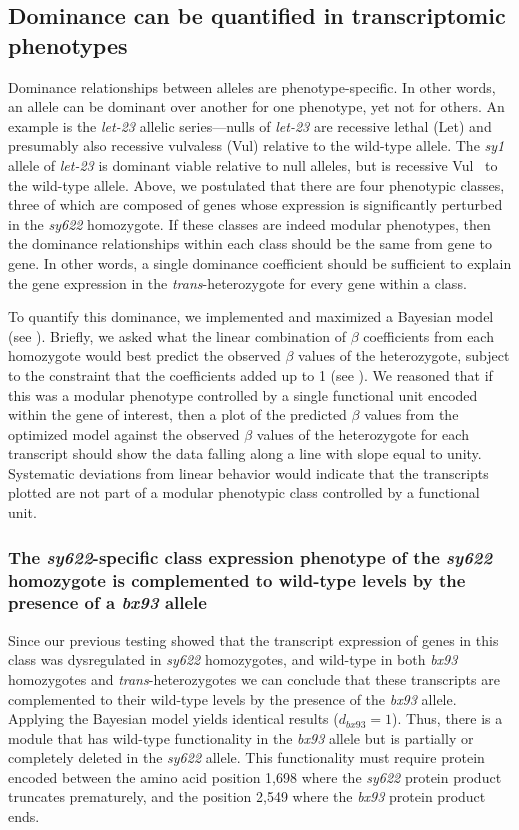 \documentclass[10pt, twocolumn]{article}
\newcommand{\gene}[1]{\mbox{\emph{#1}}}
\begin{document}
\subsection*{Dominance can be quantified in transcriptomic phenotypes}
Dominance relationships between alleles are phenotype-specific. In other words,
an allele can be dominant over another for one phenotype, yet not for others. An
example is the \gene{let-23} allelic series---nulls of \gene{let-23} are
recessive lethal (Let) and presumably also recessive vulvaless (Vul) relative to
the wild-type allele. The \emph{sy1} allele of \gene{let-23} is dominant viable
relative to null alleles, but is recessive Vul~\cite{Aroian1991} to the
wild-type allele. Above, we postulated that there are four phenotypic classes,
three of which are composed of genes whose expression is significantly perturbed
in the \emph{sy622} homozygote. If these classes are indeed modular phenotypes,
then the dominance relationships within each class should be the same from gene
to gene. In other words, a single dominance coefficient should be sufficient to
explain the gene expression in the \emph{trans}-heterozygote for every gene
within a class.

To quantify this dominance, we implemented and maximized a Bayesian model (see
). Briefly, we asked what the linear combination of $\beta$
coefficients from each homozygote would best predict the observed $\beta$ values
of the heterozygote, subject to the constraint that the coefficients added up to
1 (see ). We reasoned that if this was a modular
phenotype controlled by a single functional unit encoded within the gene of
interest, then a plot of the predicted $\beta$ values from the optimized model
against the observed $\beta$ values of the heterozygote for each transcript
should show the data falling along a line with slope equal to unity. Systematic
deviations from linear behavior would indicate that the transcripts plotted are
not part of a modular phenotypic class controlled by a functional unit.

\subsubsection*{The \emph{sy622}-specific class expression phenotype of the
                \emph{sy622} homozygote is complemented to wild-type levels by
                the presence of a \emph{bx93} allele}
Since our previous testing showed that the transcript expression of genes in
this class was dysregulated in \emph{sy622} homozygotes, and wild-type in both
\emph{bx93} homozygotes and \emph{trans}-heterozygotes we can conclude that
these transcripts are complemented to their wild-type levels by the presence of
the \emph{bx93} allele. Applying the Bayesian model yields identical results
($d_{bx93} = 1$). Thus, there is a module that has wild-type functionality in
the \emph{bx93} allele but is partially or completely deleted in the
\emph{sy622} allele. This functionality must require protein encoded between the
amino acid position 1,698 where the \emph{sy622} protein product truncates
prematurely, and the position 2,549 where the \emph{bx93} protein product ends.
\end{document}
